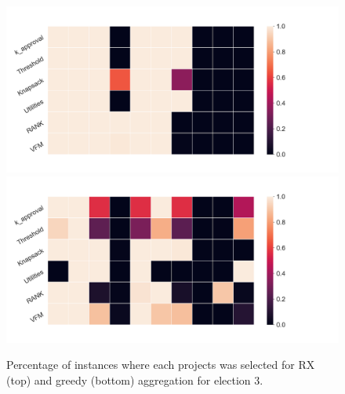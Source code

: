 \documentclass[10pt]{article}
\begin{document}
\begin{appendices}
\begin{figure}[!htbp]
\begin{center}
\includegraphics[width=18cm]{experiment/election_3_rx.png}
\includegraphics[width=18cm]{experiment/election_3_greedy.png}
\caption{Percentage of instances where each projects was selected for RX (top) and greedy (bottom)
aggregation for election 3.
}\label{fig:stability3}
\end{center}
\end{figure}


\end{appendices}
\end{document}
